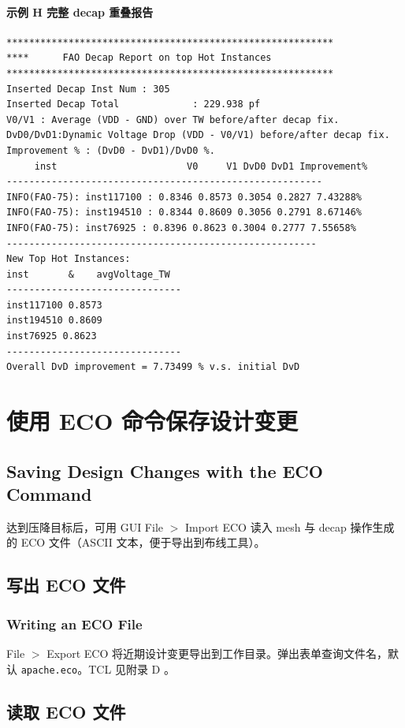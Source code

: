 \paragraph{示例 H 完整 decap 重叠报告}
\begin{lstlisting}
**********************************************************
****      FAO Decap Report on top Hot Instances
**********************************************************
Inserted Decap Inst Num : 305
Inserted Decap Total             : 229.938 pf
V0/V1 : Average (VDD - GND) over TW before/after decap fix.
DvD0/DvD1:Dynamic Voltage Drop (VDD - V0/V1) before/after decap fix.
Improvement % : (DvD0 - DvD1)/DvD0 %.
     inst                       V0     V1 DvD0 DvD1 Improvement%
--------------------------------------------------------
INFO(FAO-75): inst117100 : 0.8346 0.8573 0.3054 0.2827 7.43288%
INFO(FAO-75): inst194510 : 0.8344 0.8609 0.3056 0.2791 8.67146%
INFO(FAO-75): inst76925 : 0.8396 0.8623 0.3004 0.2777 7.55658%
-------------------------------------------------------
New Top Hot Instances:
inst       &    avgVoltage_TW
-------------------------------
inst117100 0.8573
inst194510 0.8609
inst76925 0.8623
-------------------------------
Overall DvD improvement = 7.73499 % v.s. initial DvD
\end{lstlisting}


\section{使用 ECO 命令保存设计变更}
\subsection*{Saving Design Changes with the ECO Command}

达到压降目标后，可用 GUI File $>$ Import ECO 读入 mesh 与 decap 操作生成的 ECO 文件（ASCII 文本，便于导出到布线工具）。

\subsection{写出 ECO 文件}
\subsubsection*{Writing an ECO File}

File $>$ Export ECO 将近期设计变更导出到工作目录。弹出表单查询文件名，默认 \texttt{apache.eco}。TCL 见附录 D 。

\subsection{读取 ECO 文件}
